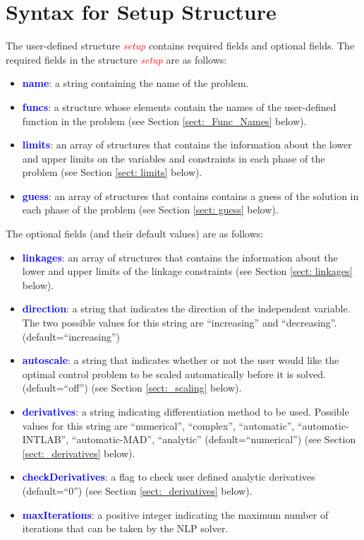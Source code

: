 \documentclass[10pt,final]{report}
\newcommand{\bfblue}[1]{\textcolor{blue}{\bf #1}}
\newcommand{\slred}[1]{\textcolor{red}{\sl #1}}
\begin{document}
\section{Syntax for Setup Structure  \label{sect: structure syntax}}

The user-defined structure \slred{setup} contains required fields and
optional fields.  The required fields in the structure \slred{setup}
are as follows:
\begin{itemize}
\item \bfblue{name}:  a string containing the name of the problem.
\item \bfblue{funcs}:  a structure whose elements contain the names
  of the user-defined function in the problem (see Section \ref{sect:_Func_Names} below).
\item \bfblue{limits}:  an array of structures that contains the
  information about the lower and upper limits on the variables and
  constraints in each phase of the problem (see Section \ref{sect: limits} below).
\item \bfblue{guess}:  an array of structures that contains
  contains a guess of the solution in each phase of the problem (see Section
  \ref{sect: guess} below).
\end{itemize}
The optional fields (and their default values) are as follows:
\begin{itemize}
\item \bfblue{linkages}: an array of structures that contains the
  information about the lower and upper limits of the linkage constraints (see Section \ref{sect: linkages} below).
\item \bfblue{direction}:  a string that indicates the direction of
  the independent variable.  The two possible values for this string
  are ``increasing'' and ``decreasing''. (default=``increasing'')
\item \bfblue{autoscale}: a string that indicates whether or not
  the user would like the optimal control problem to be scaled
  automatically before it is solved. (default=``off'') (see Section \ref{sect:_scaling} below).
\item \bfblue{derivatives}:  a string indicating differentiation method to be used.  Possible values for this   string are ``numerical'', ``complex'', ``automatic'', ``automatic-INTLAB'', ``automatic-MAD'', ``analytic'' (default=``numerical'') (see Section \ref{sect:_derivatives} below).
\item \bfblue{checkDerivatives}: a flag to check user defined analytic derivatives (default=``0'') (see Section \ref{sect:_derivatives} below).
\item \bfblue{maxIterations}:  a positive integer indicating the maximum number of iterations that can be taken by the NLP solver.  
\end{itemize}
\end{document}
